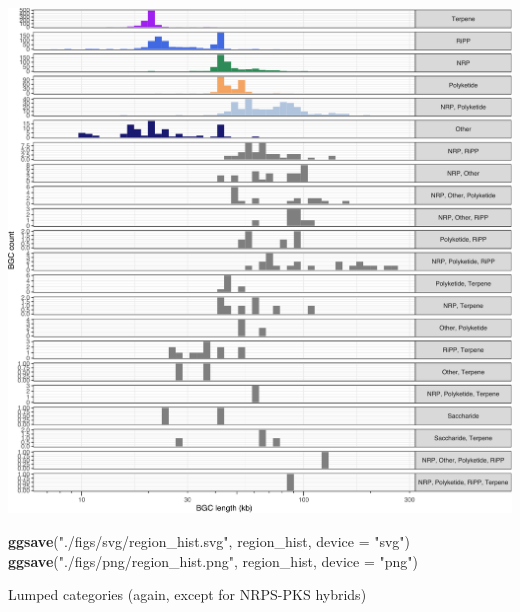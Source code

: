 \documentclass[
]{article}
\newenvironment{Shaded}{\begin{snugshade}}{\end{snugshade}}
\newcommand{\AttributeTok}[1]{\textcolor[rgb]{0.13,0.29,0.53}{#1}}
\newcommand{\FunctionTok}[1]{\textcolor[rgb]{0.13,0.29,0.53}{\textbf{#1}}}
\newcommand{\NormalTok}[1]{#1}
\newcommand{\StringTok}[1]{\textcolor[rgb]{0.31,0.60,0.02}{#1}}
\begin{document}
\includegraphics{analysis_files/figure-latex/unnamed-chunk-10-1.pdf}

\begin{Shaded}
\begin{Highlighting}[]
\FunctionTok{ggsave}\NormalTok{(}\StringTok{"./figs/svg/region\_hist.svg"}\NormalTok{, region\_hist, }\AttributeTok{device =} \StringTok{"svg"}\NormalTok{)}
\FunctionTok{ggsave}\NormalTok{(}\StringTok{"./figs/png/region\_hist.png"}\NormalTok{, region\_hist, }\AttributeTok{device =} \StringTok{"png"}\NormalTok{)}
\end{Highlighting}
\end{Shaded}

Lumped categories (again, except for NRPS-PKS hybrids)
\end{document}
